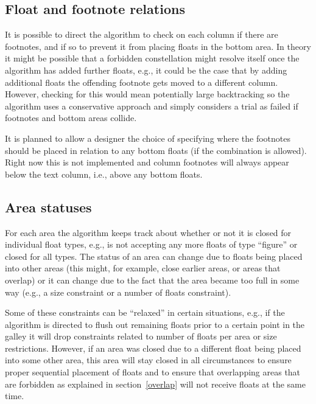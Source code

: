 \documentclass[twocolumn]{article}
\begin{document}
\subsection{Float and footnote relations}

It is possible to direct the algorithm to check on each column if
there are footnotes, and if so to prevent it from placing floats in
the bottom 
area. In theory it might be possible that a forbidden constellation
might resolve itself once the algorithm has added further floats,
e.g., it could be the case that by adding additional floats the
offending footnote gets moved to a different column. However, checking
for this would mean potentially large backtracking so the algorithm
uses a conservative approach and simply considers a trial as failed if
footnotes and bottom areas collide.

It is planned to allow a designer the choice of specifying where the
footnotes should be placed in relation to any bottom floats (if the
combination is allowed). Right now this is not implemented and
column footnotes will always appear below the text column, i.e., above
any bottom floats.




\subsection{Area statuses}

For each area the algorithm keeps track about whether or not it is
closed for individual float types, e.g., is not accepting any more
floats of type ``figure'' or closed for all types. The status of an
area can change due to floats being placed into other areas (this
might, for example, close earlier areas, or areas that overlap) or it
can change due to the fact that the area became too full in some way
(e.g., a size constraint or a number of floats constraint).

Some of these constraints can be ``relaxed'' in certain situations,
e.g., if the algorithm is directed to flush out remaining floats prior
to a certain point in the galley it will drop constraints related to
number of floats per area or size restrictions. However, if an area
was closed due to a different float being placed into some other area,
this area will stay closed in all circumstances to ensure proper
sequential placement of floats and to ensure that overlapping areas
that are forbidden as explained in section~\vref{overlap} will not
receive floats at the same time.
\end{document}
